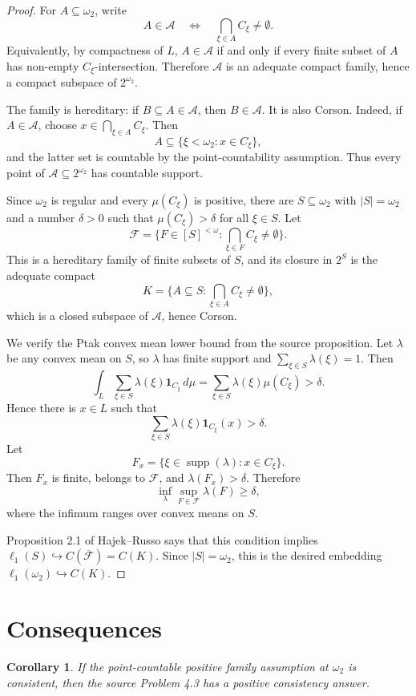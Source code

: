 \documentclass[11pt]{article}
\newtheorem{corollary}{Corollary}
\newcommand{\supp}{\operatorname{supp}}
\newcommand{\ellone}{\ell_1}
\newcommand{\omegatwo}{\omega_2}
\newcommand{\cA}{\mathcal{A}}
\newcommand{\cF}{\mathcal{F}}
\newcommand{\embed}{\hookrightarrow}
\begin{document}
\begin{proof}
For \(A\subseteq\omegatwo\), write
\[
A\in\cA
\quad\Longleftrightarrow\quad
\bigcap_{\xi\in A} C_\xi\ne\emptyset .
\]
Equivalently, by compactness of \(L\), \(A\in\cA\) if and only if every finite
subset of \(A\) has non-empty \(C_\xi\)-intersection.  Therefore \(\cA\) is
an adequate compact family, hence a compact subspace of \(2^{\omegatwo}\).

The family is hereditary: if \(B\subseteq A\in\cA\), then \(B\in\cA\).  It is
also Corson.  Indeed, if \(A\in\cA\), choose \(x\in\bigcap_{\xi\in A}C_\xi\).
Then
\[
A\subseteq \{\xi<\omegatwo:x\in C_\xi\},
\]
and the latter set is countable by the point-countability assumption.  Thus
every point of \(\cA\subseteq 2^{\omegatwo}\) has countable support.

Since \(\omegatwo\) is regular and every \(\mu(C_\xi)\) is positive, there
are \(S\subseteq\omegatwo\) with \(|S|=\omegatwo\) and a number
\(\delta>0\) such that \(\mu(C_\xi)>\delta\) for all \(\xi\in S\).  Let
\[
\cF=\{F\in [S]^{<\omega}:\bigcap_{\xi\in F}C_\xi\ne\emptyset\}.
\]
This is a hereditary family of finite subsets of \(S\), and its closure in
\(2^S\) is the adequate compact
\[
K=\{A\subseteq S:\bigcap_{\xi\in A}C_\xi\ne\emptyset\},
\]
which is a closed subspace of \(\cA\), hence Corson.

We verify the Ptak convex mean lower bound from the source proposition.  Let
\(\lambda\) be any convex mean on \(S\), so \(\lambda\) has finite support and
\(\sum_{\xi\in S}\lambda(\xi)=1\).  Then
\[
\int_L \sum_{\xi\in S}\lambda(\xi)\mathbf{1}_{C_\xi}\,d\mu
=
\sum_{\xi\in S}\lambda(\xi)\mu(C_\xi)
>\delta .
\]
Hence there is \(x\in L\) such that
\[
\sum_{\xi\in S}\lambda(\xi)\mathbf{1}_{C_\xi}(x)>\delta .
\]
Let
\[
F_x=\{\xi\in\supp(\lambda):x\in C_\xi\}.
\]
Then \(F_x\) is finite, belongs to \(\cF\), and
\(\lambda(F_x)>\delta\).  Therefore
\[
\inf_{\lambda}\sup_{F\in\cF}\lambda(F)\ge \delta,
\]
where the infimum ranges over convex means on \(S\).

Proposition 2.1 of Hajek--Russo says that this condition implies
\(\ellone(S)\embed C(\overline{\cF})=C(K)\).  Since \(|S|=\omegatwo\), this is
the desired embedding \(\ellone(\omegatwo)\embed C(K)\).
\end{proof}

\section*{Consequences}

\begin{corollary}
If the point-countable positive family assumption at \(\omegatwo\) is
consistent, then the source Problem 4.3 has a positive consistency answer.
\end{corollary}
\end{document}
